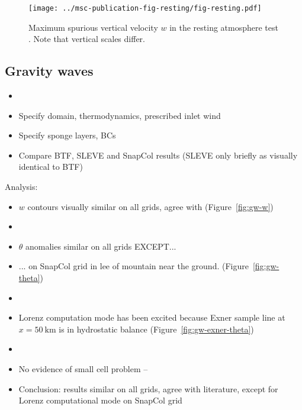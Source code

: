\documentclass[twocol]{ametsoc}
\begin{document}
\begin{figure}
	\centering
	\texttt{[image: ../msc-publication-fig-resting/fig-resting.pdf]}
%
	\caption{Maximum spurious vertical velocity $w$ in the resting atmosphere test .  Note that vertical scales differ.}
	\label{fig:resting}
\end{figure}

\subsection{Gravity waves}
\begin{itemize}
	\item {}
	\item Specify domain, thermodynamics, prescribed inlet wind
	\item Specify sponge layers, BCs
	\item Compare BTF, SLEVE and SnapCol results (SLEVE only briefly as visually identical to BTF)
\end{itemize}

Analysis:
\begin{itemize}
	\item $w$ contours visually similar on all grids, agree with \citet{melvin2010} (Figure~\ref{fig:gw-w})
	\item {}
	\item $\theta$ anomalies similar on all grids EXCEPT...
	\item ... on SnapCol grid in lee of mountain near the ground. (Figure~\ref{fig:gw-theta})
	\item {}
	\item Lorenz computation mode has been excited because Exner sample line at $x = \SI{50}{\kilo\meter}$ is in hydrostatic balance (Figure~\ref{fig:gw-exner-theta})
	\item {}
	\item No evidence of small cell problem -- 
	\item Conclusion: results similar on all grids, agree with literature, except for Lorenz computational mode on SnapCol grid
\end{itemize}
\end{document}
